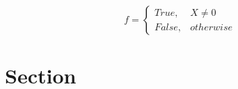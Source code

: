 \documentclass[a4paper]{article}
\begin{document}
\begin{equation}   f =
\begin{cases} True, & X \neq 0\\
False, & otherwise
\end{cases}
\end{equation}

\section{Section}
\end{document}
